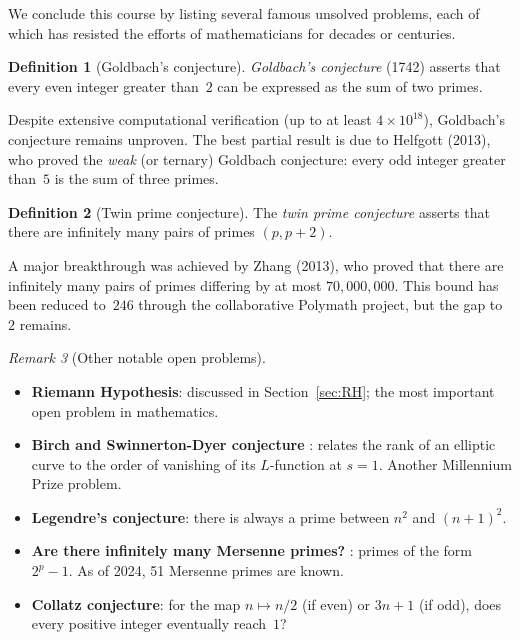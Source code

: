 \documentclass[12pt,a4paper,openany]{book}
\theoremstyle{definition}
\newtheorem{definition}{Definition}[chapter]
\theoremstyle{plain}
\theoremstyle{remark}
\newtheorem{remark}[definition]{Remark}
\begin{document}
We conclude this course by listing several famous unsolved problems, each of
which has resisted the efforts of mathematicians for decades or centuries.

\begin{definition}[Goldbach's conjecture]
\label{def:goldbach}
\emph{Goldbach's conjecture} (1742) asserts that every even integer greater
than~$2$ can be expressed as the sum of two primes.
\end{definition}

Despite extensive computational verification (up to at least $4\times 10^{18}$),
Goldbach's conjecture remains unproven. The best partial result is due to
Helfgott (2013), who proved the \emph{weak} (or ternary)
Goldbach conjecture: every odd integer greater
than~$5$ is the sum of three primes.

\begin{definition}[Twin prime conjecture]
\label{def:twin-primes}
The \emph{twin prime conjecture} asserts that there are infinitely many pairs
of primes $(p, p+2)$.
\end{definition}

A major breakthrough was achieved by Zhang (2013), who
proved that there are infinitely many pairs of primes differing by at most
$70{,}000{,}000$. This bound has been reduced to~$246$ through the collaborative
Polymath project, but the gap to~$2$ remains.

\begin{remark}[Other notable open problems]
\label{rem:other-open}
\begin{itemize}
  \item \textbf{Riemann Hypothesis}: discussed in
    Section~\ref{sec:RH}; the most important open problem in mathematics.
  \item \textbf{Birch and Swinnerton-Dyer conjecture}%
    : relates the rank of an
    elliptic curve to the order of vanishing of its $L$-function at $s=1$.
    Another Millennium Prize problem.
  \item \textbf{Legendre's conjecture}: there is
    always a prime between $n^2$ and $(n+1)^2$.
  \item \textbf{Are there infinitely many Mersenne primes?}%
    : primes of the form $2^p - 1$. As of 2024, 51
    Mersenne primes are known.
  \item \textbf{Collatz conjecture}: for the map
    $n \mapsto n/2$ (if even) or $3n+1$ (if odd), does every positive integer
    eventually reach~$1$?
\end{itemize}
\end{remark}
\end{document}
